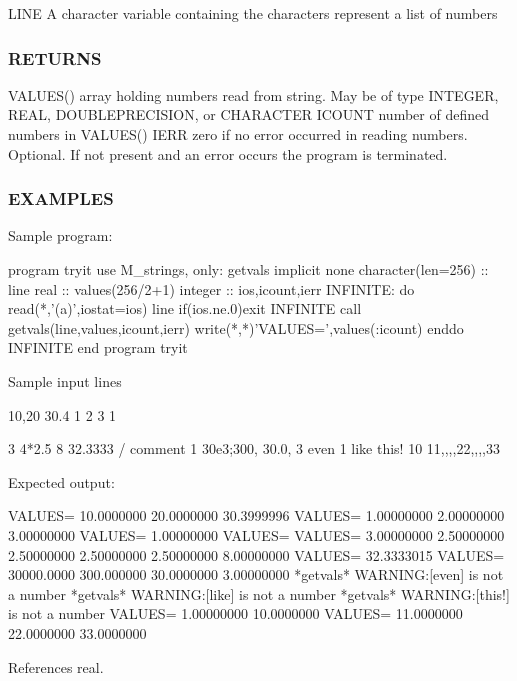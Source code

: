 L\+I\+NE A character variable containing the characters represent a list of numbers

\subsubsection*{R\+E\+T\+U\+R\+NS}

V\+A\+L\+U\+E\+S() array holding numbers read from string. May be of type I\+N\+T\+E\+G\+ER, R\+E\+AL, D\+O\+U\+B\+L\+E\+P\+R\+E\+C\+I\+S\+I\+ON, or C\+H\+A\+R\+A\+C\+T\+ER I\+C\+O\+U\+NT number of defined numbers in V\+A\+L\+U\+E\+S() I\+E\+RR zero if no error occurred in reading numbers. Optional. If not present and an error occurs the program is terminated.

\subsubsection*{E\+X\+A\+M\+P\+L\+ES}

Sample program\+: \begin{DoxyVerb}program tryit
use M_strings, only: getvals
implicit none
character(len=256) :: line
real               :: values(256/2+1)
integer            :: ios,icount,ierr
INFINITE: do
   read(*,'(a)',iostat=ios) line
   if(ios.ne.0)exit INFINITE
   call getvals(line,values,icount,ierr)
   write(*,*)'VALUES=',values(:icount)
enddo INFINITE
end program tryit
\end{DoxyVerb}


Sample input lines \begin{DoxyVerb} 10,20 30.4
 1 2 3
 1

 3 4*2.5 8
 32.3333 / comment 1
 30e3;300,    30.0, 3
 even 1 like this! 10
 11,,,,22,,,,33
\end{DoxyVerb}


Expected output\+: \begin{DoxyVerb}VALUES=   10.0000000       20.0000000       30.3999996
VALUES=   1.00000000       2.00000000       3.00000000
VALUES=   1.00000000
VALUES=
VALUES=   3.00000000       2.50000000       2.50000000       2.50000000       2.50000000       8.00000000
VALUES=   32.3333015
VALUES=   30000.0000       300.000000       30.0000000       3.00000000
*getvals* WARNING:[even] is not a number
*getvals* WARNING:[like] is not a number
*getvals* WARNING:[this!] is not a number
VALUES=   1.00000000       10.0000000
VALUES=   11.0000000       22.0000000       33.0000000 \end{DoxyVerb}
 

References real.

